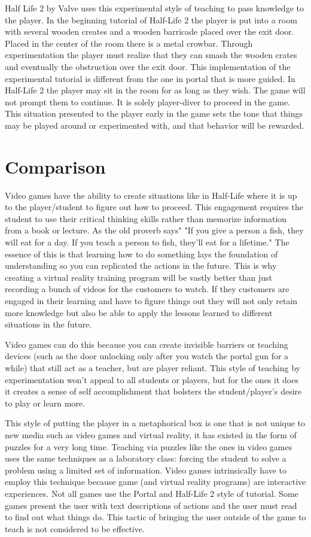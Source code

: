 \documentclass[onecolumn, draftclsnofoot,10pt, compsoc]{IEEEtran}
\begin{document}
Half Life 2 by Valve uses this experimental style of teaching to pass knowledge to the player. In the beginning tutorial of Half-Life 2 the player is put into a room with several wooden creates and a wooden barricade placed over the exit door. Placed in the center of the room there is a metal crowbar. Through experimentation the player must realize that they can smash the wooden crates and eventually the obstruction over the exit door. This implementation of the experimental tutorial is different from the one in portal that is more guided. In Half-Life 2 the player may sit in the room for as long as they wish. The game will not prompt them to continue. It is solely player-diver to proceed in the game. This situation presented to the player early in the game sets the tone that things may be played around or experimented with, and that behavior will be rewarded.
\cite{hl2}

\section*{Comparison}
Video games have the ability to create situations like in Half-Life where it is up to the player/student to figure out how to proceed. This engagement requires the student to use their critical thinking skills rather than memorize information from a book or lecture. As the old proverb says" "If you give a person a fish, they will eat for a day. If you teach a person to fish, they'll eat for a lifetime." The essence of this is that learning how to do something lays the foundation of understanding so you can replicated the actions in the future. This is why creating a virtual reality training program will be vastly better than just recording a bunch of videos for the customers to watch. If they customers are engaged in their learning and have to figure things out they will not only retain more knowledge but also be able to apply the lessons learned to different situations in the future.

Video games can do this because you can create invisible barriers or teaching devices (such as the door unlocking only after you watch the portal gun for a while) that still act as a teacher, but are player reliant. This style of teaching by experimentation won't appeal to all students or players, but for the ones it does it creates a sense of self accomplishment that bolsters the student/player's desire to play or learn more.

This style of putting the player in a metaphorical box is one that is not unique to new media such as video games and virtual reality, it has existed in the form of puzzles for a very long time. Teaching via puzzles like the ones in video games uses the same techniques as a laboratory class: forcing the student to solve a problem using a limited set of information. Video games intrinsically have to employ this technique because game (and virtual reality programs) are interactive experiences. Not all games use the Portal and Half-Life 2 style of tutorial. Some games present the user with text descriptions of actions and the user must read to find out what things do. This tactic of bringing the user outside of the game to teach is not considered to be effective. \cite{tutorials}
\end{document}
